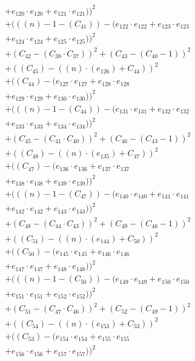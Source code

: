 \documentclass[10pt, a4paper]{article}
\begin{document}
\begin{small}
\begin{align*}
& + e_{120} \cdot e_{120} + e_{121} \cdot e_{121}))^{2} \\
& + (((n) - 1 - (C_{41})) - (e_{122} \cdot e_{122} + e_{123} \cdot e_{123} \\
& + e_{124} \cdot e_{124} + e_{125} \cdot e_{125}))^{2} \\
& + (C_{42} - (C_{38}  \cdot  C_{37}))^{2} + (C_{43} - (C_{40} - 1))^{2} \\
& + ((C_{45}) - ((n)  \cdot  (e_{126}) + C_{44}))^{2} \\
& + ((C_{44}) - (e_{127} \cdot e_{127} + e_{128} \cdot e_{128} \\
& + e_{129} \cdot e_{129} + e_{130} \cdot e_{130}))^{2} \\
& + (((n) - 1 - (C_{44})) - (e_{131} \cdot e_{131} + e_{132} \cdot e_{132} \\
& + e_{133} \cdot e_{133} + e_{134} \cdot e_{134}))^{2} \\
& + (C_{45} - (C_{41}  \cdot  C_{40}))^{2} + (C_{46} - (C_{43} - 1))^{2} \\
& + ((C_{48}) - ((n)  \cdot  (e_{135}) + C_{47}))^{2} \\
& + ((C_{47}) - (e_{136} \cdot e_{136} + e_{137} \cdot e_{137} \\
& + e_{138} \cdot e_{138} + e_{139} \cdot e_{139}))^{2} \\
& + (((n) - 1 - (C_{47})) - (e_{140} \cdot e_{140} + e_{141} \cdot e_{141} \\
& + e_{142} \cdot e_{142} + e_{143} \cdot e_{143}))^{2} \\
& + (C_{48} - (C_{44}  \cdot  C_{43}))^{2} + (C_{49} - (C_{46} - 1))^{2} \\
& + ((C_{51}) - ((n)  \cdot  (e_{144}) + C_{50}))^{2} \\
& + ((C_{50}) - (e_{145} \cdot e_{145} + e_{146} \cdot e_{146} \\
& + e_{147} \cdot e_{147} + e_{148} \cdot e_{148}))^{2} \\
& + (((n) - 1 - (C_{50})) - (e_{149} \cdot e_{149} + e_{150} \cdot e_{150} \\
& + e_{151} \cdot e_{151} + e_{152} \cdot e_{152}))^{2} \\
& + (C_{51} - (C_{47}  \cdot  C_{46}))^{2} + (C_{52} - (C_{49} - 1))^{2} \\
& + ((C_{54}) - ((n)  \cdot  (e_{153}) + C_{53}))^{2} \\
& + ((C_{53}) - (e_{154} \cdot e_{154} + e_{155} \cdot e_{155} \\
& + e_{156} \cdot e_{156} + e_{157} \cdot e_{157}))^{2} \\

\end{align*}
\end{small}
\end{document}

